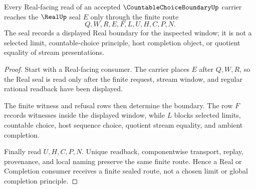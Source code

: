 \begin{theorem}
\label{thm:countable-choice-boundary-real-seal-finite-route}
Every Real-facing read of an accepted $\CountableChoiceBoundaryUp$ carrier reaches the $\RealUp$ seal $E$ only through the finite route
$$
Q,W,R,E,F,L,U,H,C,P,N .
$$
The seal records a displayed Real boundary for the inspected window; it is not a selected limit, countable-choice principle, host completion object, or quotient equality of stream presentations.
\end{theorem}
\begin{proof}
Start with a Real-facing consumer. The carrier places $E$ after $Q,W,R$, so the Real seal is read only after the finite request, stream window, and regular rational readback have been displayed.

The finite witness and refusal rows then determine the boundary. The row $F$ records witnesses inside the displayed window, while $L$ blocks selected limits, countable choice, host sequence choice, quotient stream equality, and ambient completion.

Finally read $U,H,C,P,N$. Unique readback, componentwise transport, replay, provenance, and local naming preserve the same finite route. Hence a Real or Completion consumer receives a finite sealed route, not a chosen limit or global completion principle.
\end{proof}

\begin{closurestatus}{\CountableChoiceBoundaryUp}
  \theoryclosure{\seedClosure}
  \formalstatus{\unformalizedV}
\end{closurestatus}
